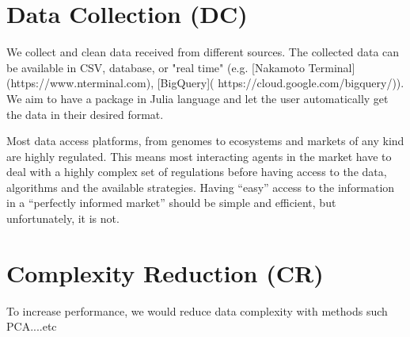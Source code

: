 \documentclass[english,12pt]{article}
\begin{document}

\section{Data Collection (DC)}
We collect and clean data received from different sources. The
collected data can be available in CSV, database, or "real time"
(e.g. [Nakamoto Terminal](https://www.nterminal.com), [BigQuery](
https://cloud.google.com/bigquery/)). We aim to have a package in
Julia language and let the user automatically get the data in their
desired format.

Most data access platforms, from genomes to ecosystems and markets of
any kind are highly regulated. This means most interacting agents in
the market have to deal with a highly complex set of regulations
before having access to the data, algorithms and the available
strategies. Having ``easy'' access to the information in a ``perfectly
informed market'' should be simple and efficient, but unfortunately,
it is not. 


\section{Complexity Reduction (CR)}

To increase performance, we would reduce data complexity with methods
such PCA....etc
\end{document}
